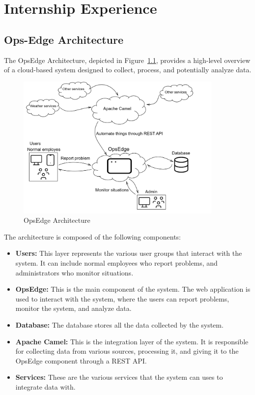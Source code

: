 \chapter{Internship Experience}
\label{ch:internship_experience}

\section{Ops-Edge Architecture}
\label{sec:internship_experience:opsedge_architecture}

The OpsEdge Architecture, depicted in Figure~\ref{fig:opsedge_architecture}, provides a high-level overview of a cloud-based system designed to collect, process, and potentially analyze data.

\begin{figure}[h]
    \centering
    \includegraphics[width=0.9\textwidth]{gfx/opsedge-architecture.png}
    \caption{OpsEdge Architecture}
    \label{fig:opsedge_architecture}
\end{figure}

The architecture is composed of the following components:

\begin{itemize}
    \item \textbf{Users:} This layer represents the various user groups that interact with the system. It can include normal employees who report problems, and administrators who monitor situations.
    \item \textbf{OpsEdge:} This is the main component of the system. The web application is used to interact with the system, where the users can report problems, monitor the system, and analyze data.
    \item \textbf{Database:} The database stores all the data collected by the system.
    \item \textbf{Apache Camel:} This is the integration layer of the system. It is responsible for collecting data from various sources, processing it, and giving it to the OpsEdge component through a REST API\@.
    \item \textbf{Services:} These are the various services that the system can uses to integrate data with.
\end{itemize}

